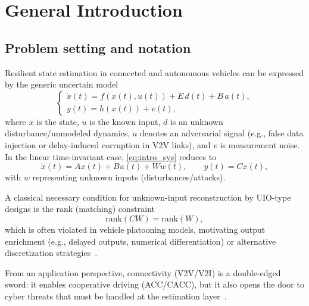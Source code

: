\chapter{General Introduction}\label{chp1_intro}


\section{Problem setting and notation}
Resilient state estimation in connected and autonomous vehicles can be expressed by the generic uncertain model
\begin{equation}\label{eq:intro_sys}
\begin{cases}
\dot{x}(t) = f(x(t),u(t)) + E\,d(t) + B\,a(t),\\
y(t) = h(x(t)) + v(t),
\end{cases}
\end{equation}
where $x$ is the state, $u$ is the known input, $d$ is an unknown disturbance/unmodeled dynamics, $a$ denotes an adversarial signal (e.g., false data injection or delay-induced corruption in V2V links), and $v$ is measurement noise. In the linear time-invariant case, \eqref{eq:intro_sys} reduces to
\begin{equation}\label{eq:intro_lti}
\dot{x}(t) = A x(t) + B u(t) + W w(t), \qquad y(t)=Cx(t),
\end{equation}
with $w$ representing unknown inputs (disturbances/attacks).

A classical necessary condition for unknown-input reconstruction by UIO-type designs is the rank (matching) constraint
\begin{equation}\label{eq:intro_rank}
\mathrm{rank}(C W)=\mathrm{rank}(W),
\end{equation}
which is often violated in vehicle platooning models, motivating output enrichment (e.g., delayed outputs, numerical differentiation) or alternative discretization strategies~\cite{darouach1994full,trinh2011functional,sliding_diff_zhu,M.Zhang}.

From an application perspective, connectivity (V2V/V2I) is a double-edged sword: it enables cooperative driving (ACC/CACC), but it also opens the door to cyber threats that must be handled at the estimation layer~\cite{Cvehicle,Bu2012,book_ali}.

